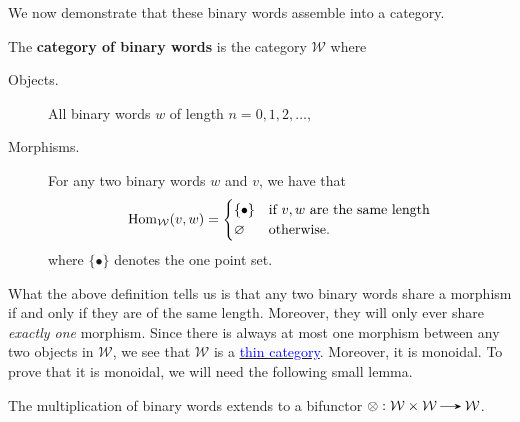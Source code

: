 We now demonstrate that these binary words assemble into a category. 

\begin{definition}
    The \textbf{category of binary words} is the category $\mathcal{W}$ where 
    \begin{description}
        \item[Objects.] All binary words $w$ of length $n = 0, 1, 2, \dots,$
        \item[Morphisms.] For any two binary words $w$ and $v$, we have that 
        \[
            \operatorname{\mathrm{Hom}}_{\mathcal{W}}(v, w) = 
            \begin{cases}
                \{ \bullet \} & \text{if } v,w \text{ are the same length}\\
                \varnothing & \text{otherwise}. 
            \end{cases}   
        \]  
        where $\{\bullet\}$ denotes the one point set.
    \end{description}
\end{definition}

What the above definition tells us is that any two binary words share 
a morphism if and only if they are of the same length. Moreover, they will only 
ever share \emph{exactly one} morphism.
Since there is always at most one morphism between any two objects 
in $\mathcal{W}$, we see that $\mathcal{W}$ is a \hyperref[definition:thin-category]{\textcolor{Blue}{thin category}}. 
Moreover, it is monoidal. To prove that it is monoidal, 
we will need the following small lemma. 

\begin{lemma}
    The multiplication of binary words extends to a bifunctor 
    $\otimes: \ww \times \ww \to \ww$.
\end{lemma}

